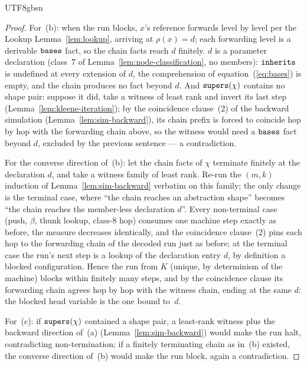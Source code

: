 \begin{CJK*}{UTF8}{gbsn}
\begin{proof}
  For~(b): when the run blocks, $x$'s reference forwards level by
  level per the Lookup Lemma~\ref{lem:lookup}, arriving at
  $\rho(x) = d$; each forwarding level is a derivable $\mathtt{bases}$ fact,
  so the chain facts reach $d$ finitely. $d$ is a parameter
  declaration (class~7 of Lemma~\ref{lem:node-classification}, no
  members): $\mathtt{inherits}$ is undefined at every extension of $d$, the
  comprehension of equation~(\ref{eq:bases}) is empty, and the chain
  produces no fact beyond $d$. And $\mathtt{supers}(\chi)$ contains no shape
  pair: suppose it did, take a witness of least rank and invert its
  last step (Lemma~\ref{lem:kleene-iteration}); by the coincidence clause~(2) of the backward simulation
  (Lemma~\ref{lem:sim-backward}), its chain prefix is forced to
  coincide hop by hop with the forwarding chain above, so the witness would need a $\mathtt{bases}$ fact beyond $d$,
  excluded by the previous sentence --- a contradiction.

  For the converse direction of~(b): let the chain facts of $\chi$
  terminate finitely at the declaration $d$, and take a witness
  family of least rank. Re-run the $(m,k)$ induction of
  Lemma~\ref{lem:sim-backward} verbatim on this family; the only
  change is the terminal case, where ``the chain reaches an
  abstraction shape'' becomes ``the chain reaches the member-less
  declaration $d$''. Every non-terminal case (push, $\beta$, thunk
  lookup, class-8 hop) consumes one machine step exactly as before,
  the measure decreases identically, and the coincidence clause~(2)
  pins each hop to the forwarding chain of the decoded run just as
  before; at the terminal case the run's next step is a lookup of
  the declaration entry $d$, by definition a blocked configuration.
  Hence the run from $K$ (unique, by determinism of the machine)
  blocks within finitely many steps, and by the coincidence clause
  its forwarding chain agrees hop by hop with the witness chain,
  ending at the same $d$: the blocked head variable is the one bound
  to~$d$.

  For~(c): if $\mathtt{supers}(\chi)$ contained a shape pair, a least-rank
  witness plus the backward direction of~(a)
  (Lemma~\ref{lem:sim-backward}) would make the run halt,
  contradicting non-termination; if a finitely terminating chain as
  in~(b) existed, the converse direction of~(b) would make the run
  block, again a contradiction.
\fi
\end{proof}


\end{CJK*}
